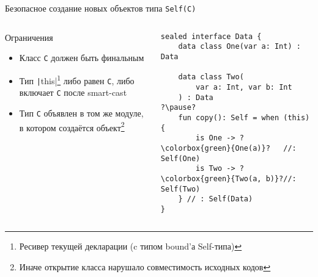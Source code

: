 \documentclass[aspectratio=169,usenames,dvipsnames]{beamer}
\begin{document}
    \begin{frame}[fragile]{Безопасное создание новых объектов типа \texttt{Self(C)}}
        \begin{columns}[onlytextwidth]
            \begin{column}[t]{0.46\textwidth}
                \begin{block}{Ограничения}
                    \begin{itemize}
                        \item Класс \texttt{C} должен быть финальным
                        \item Тип \texttt|this|\footnote{Ресивер текущей декларации (c типом bound'а Self-типа)} либо равен \texttt{С}, либо включает \texttt{C} после smart-cast
                        \item Тип \texttt{C} объявлен в том же модуле, в котором создаётся объект\footnote{Иначе открытие класса нарушало совместимость исходных кодов}
                    \end{itemize}
                \end{block}
            \end{column}\hfill%
            \begin{column}[t]{0.50\textwidth}
                \pause
                \begin{verbatim}
sealed interface Data {
    data class One(var a: Int) : Data

    data class Two(
        var a: Int, var b: Int
    ) : Data
?\pause?
    fun copy(): Self = when (this) {
        is One -> ?\colorbox{green}{One(a)}?   //: Self(One)
        is Two -> ?\colorbox{green}{Two(a, b)}?//: Self(Two)
    } // : Self(Data)
}
                \end{verbatim}
            \end{column}
        \end{columns}
    \end{frame}
\end{document}
